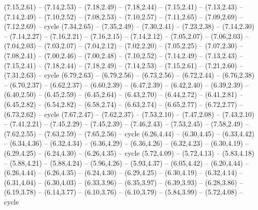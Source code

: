 \expandafter\def\csname geo:gebiet:MWI\endcsname{
  (7.15,2.61) -- (7.14,2.53) -- (7.18,2.49) -- (7.18,2.44) -- (7.15,2.41) -- (7.13,2.43) -- (7.14,2.49) -- (7.10,2.52) -- (7.08,2.53) -- (7.10,2.57) -- (7.11,2.65) -- (7.09,2.69) -- (7.12,2.69) -- cycle}
\expandafter\def\csname geo:gebiet:MOZ\endcsname{
  (7.34,2.65) -- (7.35,2.49) -- (7.30,2.41) -- (7.23,2.38) -- (7.14,2.30) -- (7.14,2.27) -- (7.16,2.21) -- (7.16,2.15) -- (7.14,2.12) -- (7.05,2.07) -- (7.06,2.03) -- (7.04,2.03) -- (7.03,2.07) -- (7.04,2.12) -- (7.02,2.20) -- (7.05,2.25) -- (7.07,2.30) -- (7.08,2.41) -- (7.00,2.46) -- (7.00,2.48) -- (7.10,2.52) -- (7.14,2.49) -- (7.13,2.43) -- (7.15,2.41) -- (7.18,2.44) -- (7.18,2.49) -- (7.14,2.53) -- (7.15,2.61) -- (7.21,2.60) -- (7.31,2.63) -- cycle}
\expandafter\def\csname geo:gebiet:SWZ\endcsname{
  }
\expandafter\def\csname geo:gebiet:AGO\endcsname{
  (6.79,2.63) -- (6.79,2.56) -- (6.73,2.56) -- (6.72,2.44) -- (6.76,2.38) -- (6.70,2.37) -- (6.62,2.37) -- (6.60,2.39) -- (6.47,2.39) -- (6.42,2.40) -- (6.39,2.39) -- (6.40,2.50) -- (6.45,2.59) -- (6.45,2.64) -- (6.43,2.70) -- (6.44,2.72) -- (6.41,2.81) -- (6.45,2.82) -- (6.54,2.82) -- (6.58,2.74) -- (6.63,2.74) -- (6.65,2.77) -- (6.72,2.77) -- (6.73,2.62) -- cycle}
\expandafter\def\csname geo:gebiet:BDI\endcsname{
  }
\expandafter\def\csname geo:gebiet:ISR\endcsname{
  }
\expandafter\def\csname geo:gebiet:LBN\endcsname{
  }
\expandafter\def\csname geo:gebiet:MDG\endcsname{
  (7.67,2.47) -- (7.62,2.37) -- (7.53,2.10) -- (7.47,2.08) -- (7.43,2.10) -- (7.41,2.21) -- (7.45,2.29) -- (7.45,2.39) -- (7.46,2.43) -- (7.53,2.45) -- (7.58,2.49) -- (7.62,2.55) -- (7.63,2.59) -- (7.65,2.56) -- cycle}
\expandafter\def\csname geo:gebiet:PSX\endcsname{
  }
\expandafter\def\csname geo:gebiet:GMB\endcsname{
  }
\expandafter\def\csname geo:gebiet:TUN\endcsname{
  (6.26,4.44) -- (6.30,4.45) -- (6.33,4.42) -- (6.34,4.36) -- (6.32,4.34) -- (6.36,4.29) -- (6.36,4.26) -- (6.32,4.23) -- (6.30,4.19) -- (6.29,4.25) -- (6.24,4.30) -- (6.26,4.35) -- cycle}
\expandafter\def\csname geo:gebiet:DZA\endcsname{
  (5.72,4.09) -- (5.72,4.13) -- (5.83,4.18) -- (5.88,4.21) -- (5.88,4.24) -- (5.96,4.26) -- (5.93,4.37) -- (6.05,4.42) -- (6.20,4.44) -- (6.26,4.44) -- (6.26,4.35) -- (6.24,4.30) -- (6.29,4.25) -- (6.30,4.19) -- (6.32,4.14) -- (6.31,4.04) -- (6.30,4.03) -- (6.33,3.96) -- (6.35,3.97) -- (6.39,3.93) -- (6.28,3.86) -- (6.19,3.78) -- (6.14,3.77) -- (6.10,3.76) -- (6.10,3.79) -- (5.84,3.99) -- (5.72,4.08) -- cycle}

